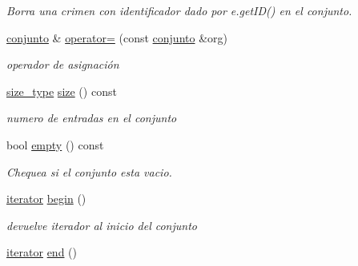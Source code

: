 \begin{DoxyCompactItemize}
\begin{DoxyCompactList}\small\item\em Borra una crimen con identificador dado por e.\-get\-I\-D() en el conjunto. \end{DoxyCompactList}\item 
\hyperlink{classconjunto}{conjunto} \& \hyperlink{classconjunto_a052fe2f4e16d01b54a86b90d7c8d5b25}{operator=} (const \hyperlink{classconjunto}{conjunto} \&org)
\begin{DoxyCompactList}\small\item\em operador de asignación \end{DoxyCompactList}\item 
\hyperlink{classconjunto_a855a5893bb0f5a851ab2dbf2b8aa6cc7}{size\-\_\-type} \hyperlink{classconjunto_a533c699fbbbdcb8b9f8362f3b27cd9d7}{size} () const 
\begin{DoxyCompactList}\small\item\em numero de entradas en el conjunto \end{DoxyCompactList}\item 
bool \hyperlink{classconjunto_afcf4ff3ff3c1f83b63e901efebe93533}{empty} () const 
\begin{DoxyCompactList}\small\item\em Chequea si el conjunto esta vacio. \end{DoxyCompactList}\item 
\hypertarget{classconjunto_af90b2324c2675dd4751a79f2e2ad8277}{\hyperlink{classconjunto_1_1iterator}{iterator} \hyperlink{classconjunto_af90b2324c2675dd4751a79f2e2ad8277}{begin} ()}\label{classconjunto_af90b2324c2675dd4751a79f2e2ad8277}

\begin{DoxyCompactList}\small\item\em devuelve iterador al inicio del conjunto \end{DoxyCompactList}\item 
\hypertarget{classconjunto_adeef17ca21f1fb29f803790c89c1fc56}{\hyperlink{classconjunto_1_1iterator}{iterator} \hyperlink{classconjunto_adeef17ca21f1fb29f803790c89c1fc56}{end} ()}\label{classconjunto_adeef17ca21f1fb29f803790c89c1fc56}


\end{DoxyCompactItemize}
